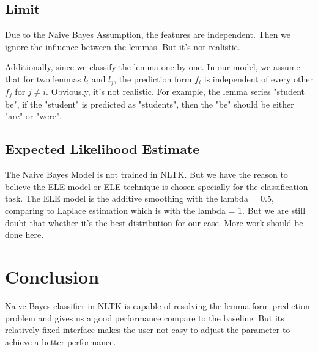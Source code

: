 \documentclass[a4paper]{article}
\begin{document}
\subsection*{Limit}
Due to the Naive Bayes Assumption, the features are independent. Then we ignore the influence between the lemmas. But it's not realistic. 

Additionally, since we classify the lemma one by one. In our model, we assume that for two lemmas $l_i$ and $l_{j}$, the prediction form $f_{i}$ is independent of every other $f_{j}$ for $j \neq i$. Obviously, it's not realistic. For example, the lemma series "student be", if the "student" is predicted as "students", then the "be" should be either "are" or "were".
\subsection*{Expected Likelihood Estimate}
The Naive Bayes Model is not trained in NLTK. But we have the reason to believe the ELE model or ELE technique is chosen specially for the classification task. 
The ELE model is the additive smoothing with the lambda = 0.5, comparing to Laplace estimation which is with the lambda = 1.
But we are still doubt that whether it's the best distribution for our case. More work should be done here.

\section{Conclusion}
Naive Bayes classifier in NLTK is capable of resolving the lemma-form prediction problem and gives us a good performance compare to the baseline. But its relatively fixed interface makes the user not easy to adjust the parameter to achieve a better performance.





\end{document}
